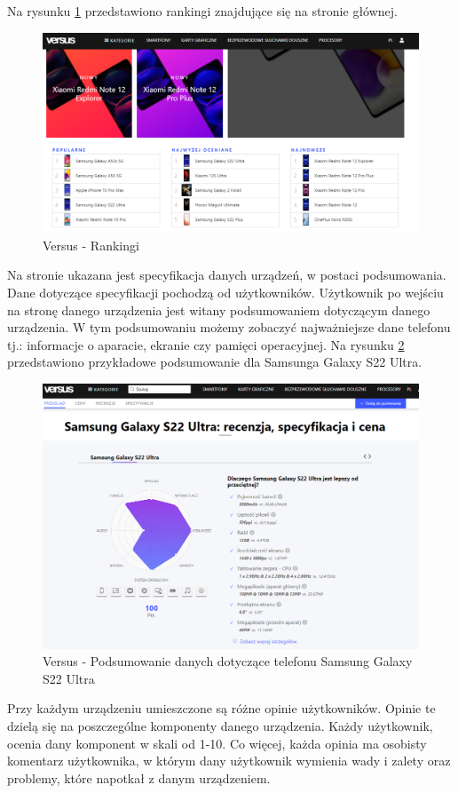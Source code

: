 Na rysunku \ref*{versus_1} przedstawiono rankingi znajdujące się na stronie głównej.
\begin{figure}[H]
    \centering
    \includegraphics[scale=0.45]{img/versus/versusRankingi.png}
    \caption{Versus - Rankingi}
    \label{versus_1}
\end{figure}
Na stronie ukazana jest specyfikacja danych urządzeń, w postaci podsumowania. Dane dotyczące specyfikacji pochodzą od użytkowników. Użytkownik po wejściu na stronę danego urządzenia jest witany podsumowaniem dotyczącym danego urządzenia. W tym podsumowaniu możemy zobaczyć najważniejsze dane telefonu tj.: informacje o aparacie, ekranie czy pamięci operacyjnej.
\newpage
Na rysunku \ref*{versus_2} przedstawiono przykładowe podsumowanie dla Samsunga Galaxy S22 Ultra.
\begin{figure}[H]
    \centering
    \includegraphics[scale=0.4]{img/versus/versusDetails.png}
    \caption{Versus - Podsumowanie danych dotyczące telefonu Samsung Galaxy S22 Ultra}
    \label{versus_2}
\end{figure}
Przy każdym urządzeniu umieszczone są różne opinie użytkowników. Opinie te dzielą się na poszczególne komponenty danego urządzenia. Każdy użytkownik, ocenia dany komponent w skali od 1-10. Co więcej, każda opinia ma osobisty komentarz użytkownika, w którym dany użytkownik wymienia wady i zalety oraz problemy, które napotkał z danym urządzeniem.

